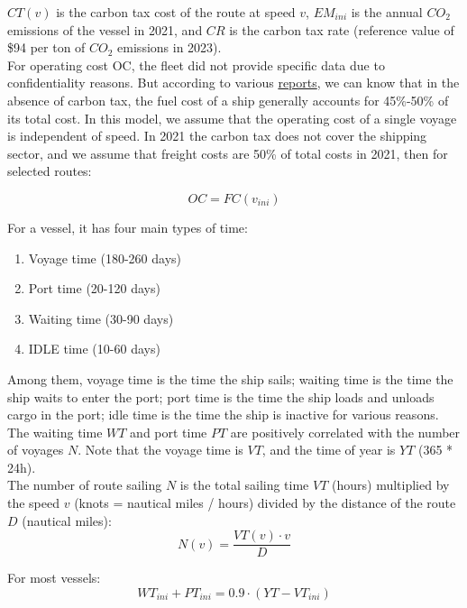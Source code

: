 \documentclass[a4paper,12pt]{article}
\begin{document}
$CT(v)$ is the carbon tax cost of the route at speed $v$, $EM_{ini}$ is the annual $CO_2$ emissions of the vessel in 2021, and $CR$ is the carbon tax rate (reference value of \$94 per ton of $CO_2$ emissions in 2023).\\

For operating cost OC, the fleet did not provide specific data due to confidentiality reasons.
But according to various \href{https://transportgeography.org/contents/chapter5/maritime-transportation/containerships-operating-costs-panamax-post-panamax/}{reports}, we can know that in the absence of carbon tax, the fuel cost of a ship generally accounts for 45\%-50\% of its total cost.
In this model, we assume that the operating cost of a single voyage is independent of speed.
In 2021 the carbon tax does not cover the shipping sector, and we assume that freight costs are 50\% of total costs in 2021, then for selected routes:

\begin{equation}
	\label{eq:operation_cost}
	OC = FC(v_{ini})
\end{equation}

For a vessel, it has four main types of time:
\begin{enumerate}
	\item Voyage time (180-260 days)
	\item Port time (20-120 days)
	\item Waiting time (30-90 days)
	\item IDLE time (10-60 days)
\end{enumerate}

Among them, voyage time is the time the ship sails; waiting time is the time the ship waits to enter the port; port time is the time the ship loads and unloads cargo in the port; idle time is the time the ship is inactive for various reasons.
The waiting time $WT$ and port time $PT$ are positively correlated with the number of voyages $N$.
Note that the voyage time is $VT$, and the time of year is $YT$ (365 * 24h). \\

The number of route sailing $N$ is the total sailing time $VT$ (hours) multiplied by the speed $v$ (knots = nautical miles / hours) divided by the distance of the route $D$ (nautical miles):
\begin{equation}
	\label{eq:vt}
	N(v) = \frac{VT(v) \cdot v }{D}
\end{equation}

For most vessels:
\begin{equation}
	\label{eq:ptwt0}
	WT_{ini}+PT_{ini} = 0.9 \cdot (YT-VT_{ini})
\end{equation}
\end{document}
